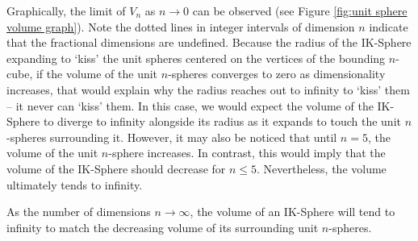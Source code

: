 Graphically, the limit of $V_n$ as $n \to 0$ can be observed (see Figure \ref{fig:unit sphere volume graph}). Note the dotted lines in integer intervals of dimension $n$ indicate that the fractional dimensions are undefined. Because the radius of the IK-Sphere expanding to `kiss' the unit spheres centered on the vertices of the bounding $n$-cube, if the volume of the unit $n$-spheres converges to zero as dimensionality increases, that would explain why the radius reaches out to infinity to `kiss' them -- it never can `kiss' them. In this case, we would expect the volume of the IK-Sphere to diverge to infinity alongside its radius as it expands to touch the unit $n$-spheres surrounding it. However, it may also be noticed that until $n=5$, the volume of the unit $n$-sphere increases. In contrast, this would imply that the volume of the IK-Sphere should decrease for $n\leq 5$. Nevertheless, the volume ultimately tends to infinity.

\pagebreak
\begin{theorem}\label{theorem:volume of IK-Sphere}
As the number of dimensions $n \to \infty$, the volume of an IK-Sphere will tend to infinity to match the decreasing volume of its surrounding unit $n$-spheres. 
\end{theorem}

